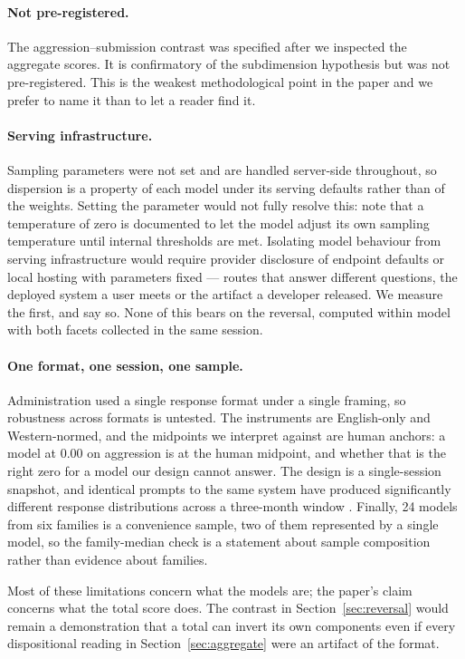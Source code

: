 \documentclass{article}
\begin{document}
\paragraph{Not pre-registered.} The aggression--submission contrast was specified after we inspected the aggregate scores. It is confirmatory of the subdimension hypothesis but was not pre-registered. This is the weakest methodological point in the paper and we prefer to name it than to let a reader find it.

\paragraph{Serving infrastructure.} Sampling parameters were not set and are handled server-side throughout, so dispersion is a property of each model under its serving defaults rather than of the weights. Setting the parameter would not fully resolve this: \citet{wang2024} note that a temperature of zero is documented to let the model adjust its own sampling temperature until internal thresholds are met. Isolating model behaviour from serving infrastructure would require provider disclosure of endpoint defaults or local hosting with parameters fixed --- routes that answer different questions, the deployed system a user meets or the artifact a developer released. We measure the first, and say so. None of this bears on the reversal, computed within model with both facets collected in the same session.

\paragraph{One format, one session, one sample.} Administration used a single response format under a single framing, so robustness across formats \citep{rottger2024} is untested. The instruments are English-only and Western-normed, and the midpoints we interpret against are human anchors: a model at 0.00 on aggression is at the human midpoint, and whether that is the right zero for a model our design cannot answer. The design is a single-session snapshot, and identical prompts to the same system have produced significantly different response distributions across a three-month window \citep{bisbee2024}. Finally, 24 models from six families is a convenience sample, two of them represented by a single model, so the family-median check is a statement about sample composition rather than evidence about families.

Most of these limitations concern what the models are; the paper's claim concerns what the total score does. The contrast in Section~\ref{sec:reversal} would remain a demonstration that a total can invert its own components even if every dispositional reading in Section~\ref{sec:aggregate} were an artifact of the format.
\end{document}
